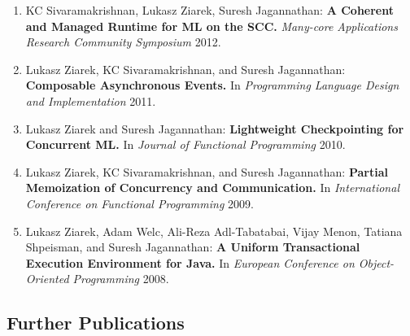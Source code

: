 \documentclass[times,11pt]{article}
\begin{document}
\noindent
\begin{enumerate}\setlength{\itemsep}{\myspace}

\item KC Sivaramakrishnan, Lukasz Ziarek, Suresh Jagannathan:
{\bf A Coherent and Managed Runtime for ML on the SCC.}
{\it Many-core Applications Research Community Symposium} 2012.

\item Lukasz Ziarek, KC Sivaramakrishnan, and Suresh Jagannathan:
{\bf Composable Asynchronous Events.}
In \emph{Programming Language Design and Implementation} 2011.

\item Lukasz Ziarek and Suresh Jagannathan:
{\bf Lightweight Checkpointing for Concurrent ML.} 
In \emph{ Journal of Functional Programming} 2010.

\item  Lukasz Ziarek, KC Sivaramakrishnan, and Suresh Jagannathan:
{\bf Partial Memoization of Concurrency and Communication.} 
In \emph{International Conference on Functional Programming} 2009.

\item Lukasz Ziarek, Adam Welc, Ali-Reza Adl-Tabatabai, Vijay Menon, 
Tatiana Shpeisman, and Suresh Jagannathan:
{\bf A Uniform Transactional Execution Environment for Java.} 
In \emph{European Conference on Object-Oriented Programming} 2008.  

\end{enumerate}


\subsection*{Further Publications}
\end{document}
